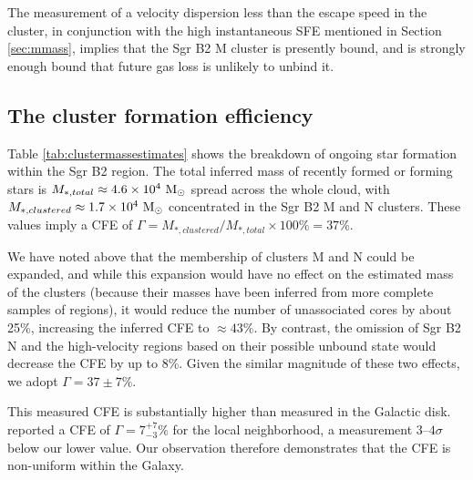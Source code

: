 \documentclass[twocolumn]{aastex62}
\begin{document}
The measurement of a velocity dispersion less than the escape speed in the cluster,
in conjunction with the high instantaneous SFE mentioned in Section \ref{sec:mmass},
implies that the Sgr B2 M cluster is presently bound, and is strongly enough
bound that future gas loss is unlikely to unbind it.


\clearpage

\clearpage

\subsection{The cluster formation efficiency}
Table \ref{tab:clustermassestimates} shows the breakdown of ongoing star
formation within the Sgr B2 region.  The total inferred mass of recently
formed or forming stars is ${M_{*,total}\approx4.6\times10^{4}~\mathrm{M}_{\odot}}$ spread across
the whole cloud, with ${M_{*,clustered}\approx1.7\times10^{4}~\mathrm{M}_{\odot}}$ concentrated
in the Sgr B2 M and N clusters.  These values imply a CFE of
$\Gamma=M_{*,clustered}/M_{*,total}\times100\% = 37\%$. 

We have noted above that the membership of clusters M and N could be expanded,
and while this expansion would have no effect on the estimated mass of the clusters
(because their masses have been inferred from more complete samples of \hii regions),
it would reduce the number of unassociated cores by about 25\%, increasing the inferred
CFE to $\approx43\%$. By contrast, the omission of Sgr B2 N and the
high-velocity \hii regions based on their possible unbound state would decrease
the CFE by up to 8\%. Given the similar magnitude of these two effects, we
adopt $\Gamma=37\pm7\%$. 

This measured CFE is substantially higher than measured in the Galactic disk.
\citet{Lada2003a} reported a CFE of $\Gamma=7^{+7}_{-3}\%$ for the local neighborhood, a
measurement $3$--$4\sigma$ below our lower value.  Our observation therefore demonstrates
that the CFE is non-uniform within the Galaxy.
\end{document}
